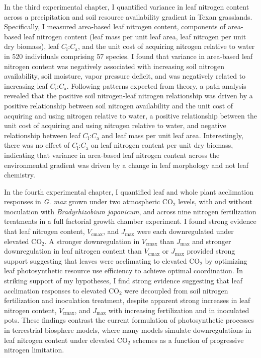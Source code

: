 In the third experimental chapter, I quantified variance in leaf nitrogen content across a precipitation and soil resource availability gradient in Texan grasslands. Specifically, I measured area-based leaf nitrogen content, components of area-based leaf nitrogen content (leaf mass per unit leaf area, leaf nitrogen per unit dry biomass), leaf $C_\mathrm{i}$:$C_\mathrm{a}$, and the unit cost of acquiring nitrogen relative to water in 520 individuals comprising 57 species. I found that variance in area-based leaf nitrogen content was negatively associated with increasing soil nitrogen availability, soil moisture, vapor pressure deficit, and was negatively related to increasing leaf $C_\mathrm{i}$:$C_\mathrm{a}$. Following patterns expected from theory, a path analysis revealed that the positive soil nitrogen-leaf nitrogen relationship was driven by a positive relationship between soil nitrogen availability and the unit cost of acquiring and using nitrogen relative to water, a positive relationship between the unit cost of acquiring and using nitrogen relative to water, and negative relationship between leaf $C_\mathrm{i}$:$C_\mathrm{a}$ and leaf mass per unit leaf area. Interestingly, there was no effect of $C_\mathrm{i}$:$C_\mathrm{a}$ on leaf nitrogen content per unit dry biomass, indicating that variance in area-based leaf nitrogen content across the environmental gradient was driven by a change in leaf morphology and not leaf chemistry. 

In the fourth experimental chapter, I quantified leaf and whole plant acclimation responses in \textit{G. max} grown under two atmospheric CO$_2$ levels, with and without inoculation with \textit{Bradyrhizobium japonicum}, and across nine nitrogen fertilization treatments in a full factorial growth chamber experiment. I found strong evidence that leaf nitrogen content, $V_\mathrm{cmax}$, and $J_\mathrm{max}$ were each downregulated under elevated CO$_2$. A stronger downregulation in $V_\mathrm{cmax}$ than $J_\mathrm{max}$ and stronger downregulation in leaf nitrogen content than $V_\mathrm{cmax}$ or $J_\mathrm{max}$ provided strong support suggesting that leaves were acclimating to elevated CO$_2$ by optimizing leaf photosynthetic resource use efficiency to achieve optimal coordination. In striking support of my hypotheses, I find strong evidence suggesting that leaf acclimation responses to elevated CO$_2$ were decoupled from soil nitrogen fertilization and inoculation treatment, despite apparent strong increases in leaf nitrogen content, $V_\mathrm{cmax}$, and $J_\mathrm{max}$ with increasing fertilization and in inoculated pots. These findings contrast the current formulation of photosynthetic processes in terrestrial biosphere models, where many models simulate downregulations in leaf nitrogen content under elevated CO$_2$ schemes as a function of progressive nitrogen limitation.

